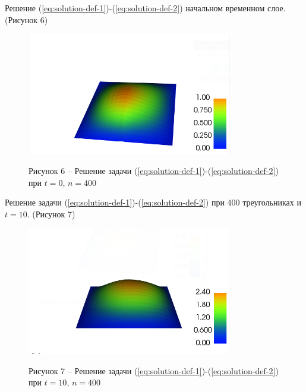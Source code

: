 Решение (\ref{eq:solution-def-1})-(\ref{eq:solution-def-2}) начальном временном слое. (Рисунок 6)
\begin{figure}[H]
      \centering
      \includegraphics[width=0.8\textwidth]{plots/n20t0.png}\\
      \centering\caption*{Рисунок 6 -- Решение задачи (\ref{eq:solution-def-1})-(\ref{eq:solution-def-2}) при $t=0$, $n=400$}
\end{figure}

Решение задачи (\ref{eq:solution-def-1})-(\ref{eq:solution-def-2}) при 400 треугольниках и $t=10$. (Рисунок 7)
\begin{figure}[H]
      \centering
      \includegraphics[width=0.8\textwidth]{plots/n20t10.png}\\
      \centering\caption*{Рисунок 7 -- Решение задачи (\ref{eq:solution-def-1})-(\ref{eq:solution-def-2}) при $t=10$, $n=400$}
\end{figure}

